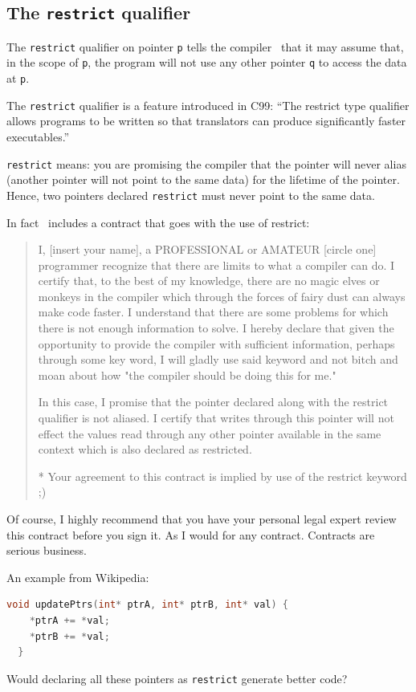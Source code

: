 \documentclass[a4paper]{report}
\begin{document}
\subsection*{The {\tt restrict} qualifier} 
The {\tt restrict} qualifier on pointer {\tt p} tells
the compiler~\cite{cellperf} that it may assume that, in the scope of {\tt p},
the program will not use any other pointer {\tt q} to access the
data at {\tt *p}.

The {\tt restrict} qualifier is a feature introduced in C99: ``The
restrict type qualifier allows programs to be written so that
translators can produce significantly faster executables.''

{\tt restrict} means: you are promising the
compiler that the pointer will never alias (another pointer will not
point to the same data) for the lifetime of the pointer.  Hence, two
pointers declared {\tt restrict} must never point to the same data.

In fact~\cite{cellperf} includes a contract that goes with the use of restrict:

\begin{quote}
I, [insert your name], a PROFESSIONAL or AMATEUR [circle one] programmer recognize that there are limits to what a compiler can do. I certify that, to the best of my knowledge, there are no magic elves or monkeys in the compiler which through the forces of fairy dust can always make code faster. I understand that there are some problems for which there is not enough information to solve. I hereby declare that given the opportunity to provide the compiler with sufficient information, perhaps through some key word, I will gladly use said keyword and not bitch and moan about how "the compiler should be doing this for me."

In this case, I promise that the pointer declared along with the restrict qualifier is not aliased. I certify that writes through this pointer will not effect the values read through any other pointer available in the same context which is also declared as restricted.

* Your agreement to this contract is implied by use of the restrict keyword ;)
\end{quote}

Of course, I highly recommend that you have your personal legal expert review this contract before you sign it. As I would for any contract. Contracts are serious business.

An example from Wikipedia:
\begin{lstlisting}[language=C]
  void updatePtrs(int* ptrA, int* ptrB, int* val) {
    *ptrA += *val;
    *ptrB += *val;
  }
\end{lstlisting}
Would declaring all these pointers as {\tt restrict} generate better code?
\end{document}
